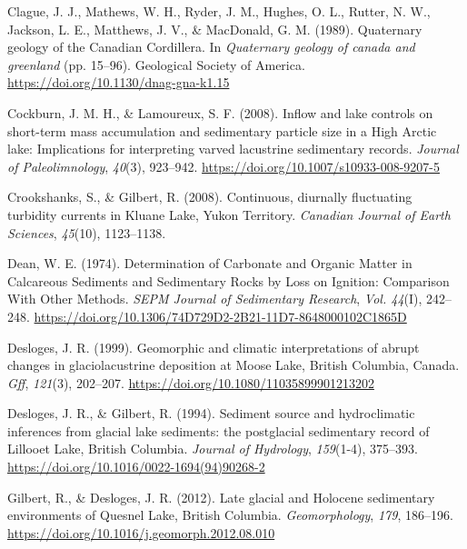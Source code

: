\documentclass[
  letterpaper,
  DIV=11,
  numbers=noendperiod]{scrartcl}
\newlength{\cslhangindent}
\newlength{\cslentryspacingunit} %
\newenvironment{CSLReferences}[2] %
 {%
  \setlength{\parindent}{0pt}
  \ifodd #1
  \let\oldpar\par
  \def\par{\hangindent=\cslhangindent\oldpar}
  \fi
  \setlength{\parskip}{#2\cslentryspacingunit}
 }%
 {}
\begin{document}
\begin{CSLReferences}{1}{0}
\leavevmode{}%
Clague, J. J., Mathews, W. H., Ryder, J. M., Hughes, O. L., Rutter, N.
W., Jackson, L. E., Matthews, J. V., \& MacDonald, G. M. (1989).
{Quaternary geology of the Canadian Cordillera}. In \emph{Quaternary
geology of canada and greenland} (pp. 15--96). Geological Society of
America. \url{https://doi.org/10.1130/dnag-gna-k1.15}

\leavevmode{}%
Cockburn, J. M. H., \& Lamoureux, S. F. (2008). {Inflow and lake
controls on short-term mass accumulation and sedimentary particle size
in a High Arctic lake: Implications for interpreting varved lacustrine
sedimentary records}. \emph{Journal of Paleolimnology}, \emph{40}(3),
923--942. \url{https://doi.org/10.1007/s10933-008-9207-5}

\leavevmode{}%
Crookshanks, S., \& Gilbert, R. (2008). {Continuous, diurnally
fluctuating turbidity currents in Kluane Lake, Yukon Territory}.
\emph{Canadian Journal of Earth Sciences}, \emph{45}(10), 1123--1138.

\leavevmode{}%
Dean, W. E. (1974). {Determination of Carbonate and Organic Matter in
Calcareous Sediments and Sedimentary Rocks by Loss on Ignition:
Comparison With Other Methods}. \emph{SEPM Journal of Sedimentary
Research}, \emph{Vol. 44}(I), 242--248.
\url{https://doi.org/10.1306/74D729D2-2B21-11D7-8648000102C1865D}

\leavevmode{}%
Desloges, J. R. (1999). {Geomorphic and climatic interpretations of
abrupt changes in glaciolacustrine deposition at Moose Lake, British
Columbia, Canada}. \emph{Gff}, \emph{121}(3), 202--207.
\url{https://doi.org/10.1080/11035899901213202}

\leavevmode{}%
Desloges, J. R., \& Gilbert, R. (1994). {Sediment source and
hydroclimatic inferences from glacial lake sediments: the postglacial
sedimentary record of Lillooet Lake, British Columbia}. \emph{Journal of
Hydrology}, \emph{159}(1-4), 375--393.
\url{https://doi.org/10.1016/0022-1694(94)90268-2}

\leavevmode{}%
Gilbert, R., \& Desloges, J. R. (2012). {Late glacial and Holocene
sedimentary environments of Quesnel Lake, British Columbia}.
\emph{Geomorphology}, \emph{179}, 186--196.
\url{https://doi.org/10.1016/j.geomorph.2012.08.010}


\end{CSLReferences}
\end{document}
